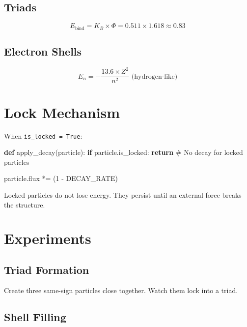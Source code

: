 \documentclass[
  11pt,
  letterpaper,
  twoside,
  openright]{book}
\newenvironment{Shaded}{\begin{snugshade}}{\end{snugshade}}
\newcommand{\CommentTok}[1]{\textcolor[rgb]{0.37,0.37,0.37}{#1}}
\newcommand{\ControlFlowTok}[1]{\textcolor[rgb]{0.00,0.23,0.31}{\textbf{#1}}}
\newcommand{\DecValTok}[1]{\textcolor[rgb]{0.68,0.00,0.00}{#1}}
\newcommand{\KeywordTok}[1]{\textcolor[rgb]{0.00,0.23,0.31}{\textbf{#1}}}
\newcommand{\NormalTok}[1]{\textcolor[rgb]{0.00,0.23,0.31}{#1}}
\newcommand{\OperatorTok}[1]{\textcolor[rgb]{0.37,0.37,0.37}{#1}}
\begin{document}
\subsection{Triads}\label{triads}

\[
E_{\text{bind}} = K_B \times \Phi = 0.511 \times 1.618 \approx 0.83
\]

\subsection{Electron Shells}\label{electron-shells-1}

\[
E_n = -\frac{13.6 \times Z^2}{n^2} \text{ (hydrogen-like)}
\]

\section{Lock Mechanism}\label{lock-mechanism}

When \texttt{is\_locked\ =\ True}:

\begin{Shaded}
\begin{Highlighting}[]
\KeywordTok{def}\NormalTok{ apply\_decay(particle):}
    \ControlFlowTok{if}\NormalTok{ particle.is\_locked:}
        \ControlFlowTok{return}  \CommentTok{\# No decay for locked particles}

\NormalTok{    particle.flux }\OperatorTok{*=}\NormalTok{ (}\DecValTok{1} \OperatorTok{{-}}\NormalTok{ DECAY\_RATE)}
\end{Highlighting}
\end{Shaded}

Locked particles do not lose energy. They persist until an external
force breaks the structure.

\section{Experiments}\label{experiments}

\subsection{Triad Formation}\label{triad-formation}

Create three same-sign particles close together. Watch them lock into a
triad.

\subsection{Shell Filling}\label{shell-filling}
\end{document}
